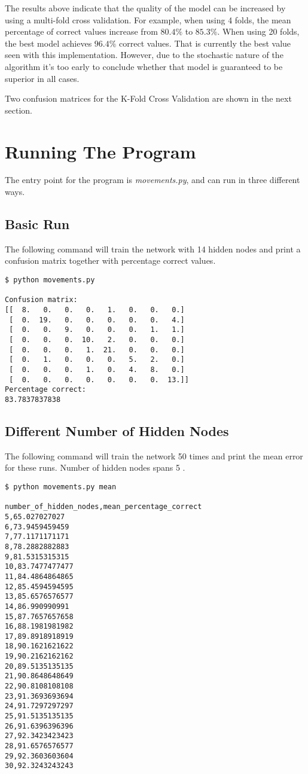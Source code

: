 \documentclass{article}
\begin{document}
\noindent The results above indicate that the quality of the model can be increased by using a multi-fold cross validation. For example, when using 4 folds, the mean percentage of correct values increase from $80.4\%$ to $85.3\%$. When using 20 folds, the best model achieves $96.4\%$ correct values. That is currently the best value seen with this implementation. However, due to the stochastic nature of the algorithm it's too early to conclude whether that model is guaranteed to be superior in all cases.

Two confusion matrices for the K-Fold Cross Validation are shown in the next section.

\section*{Running The Program}

The entry point for the program is \textit{movements.py}, and can run in three different ways.

\subsection*{Basic Run}

The following command will train the network with 14 hidden nodes and print a confusion matrix together with percentage correct values.

\begin{verbatim}
$ python movements.py

Confusion matrix:
[[  8.   0.   0.   0.   1.   0.   0.   0.]
 [  0.  19.   0.   0.   0.   0.   0.   4.]
 [  0.   0.   9.   0.   0.   0.   1.   1.]
 [  0.   0.   0.  10.   2.   0.   0.   0.]
 [  0.   0.   0.   1.  21.   0.   0.   0.]
 [  0.   1.   0.   0.   0.   5.   2.   0.]
 [  0.   0.   0.   1.   0.   4.   8.   0.]
 [  0.   0.   0.   0.   0.   0.   0.  13.]]
Percentage correct:
83.7837837838
\end{verbatim}

\subsection*{Different Number of Hidden Nodes}

The following command will train the network 50 times and print the mean error for these runs. Number of hidden nodes spans 5 .

\begin{verbatim}
$ python movements.py mean

number_of_hidden_nodes,mean_percentage_correct
5,65.027027027
6,73.9459459459
7,77.1171171171
8,78.2882882883
9,81.5315315315
10,83.7477477477
11,84.4864864865
12,85.4594594595
13,85.6576576577
14,86.990990991
15,87.7657657658
16,88.1981981982
17,89.8918918919
18,90.1621621622
19,90.2162162162
20,89.5135135135
21,90.8648648649
22,90.8108108108
23,91.3693693694
24,91.7297297297
25,91.5135135135
26,91.6396396396
27,92.3423423423
28,91.6576576577
29,92.3603603604
30,92.3243243243
\end{verbatim}
\end{document}

